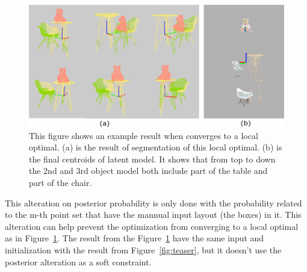 \begin{figure}[htb]
	\centering
	\includegraphics[width=\linewidth]{images/localoptimal/localoptimal}
	\caption{\label{fig:localoptimal}This figure shows an example result when converges to a local optimal. (a) is the result of segmentation of this local optimal. (b) is the final centroids of latent model. It shows that from top to down the 2nd and 3rd object model both include part of the table and part of the chair.}
\end{figure}
This alteration on posterior probability is only done with the probability related to the m-th point set that have the mannual input layout (the boxes) in it. This alteration can help prevent the optimization from converging to a local optimal as in Figure~\ref{fig:localoptimal}. The result from the Figure~\ref{fig:localoptimal} have the same input and initialization with the result from Figure~\ref{fig:teaser}, but it doesn't use the posterior alteration as a soft constraint.

